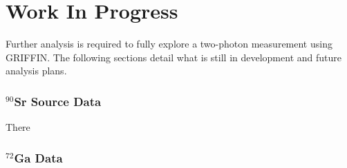 \documentclass[cnatzke_thesis_proposal.tex]{subfiles}
\begin{document}
\chapter{Work In Progress}

Further analysis is required to fully explore a two-photon measurement using GRIFFIN. 
The following sections detail what is still in development and future analysis plans. 

\subsection{$^{90}$Sr Source Data}
There


\subsection{$^{72}$Ga Data}


\end{document}
